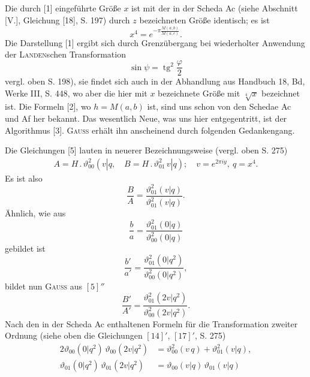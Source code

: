 \begingroup
\makeatletter\tagsleft@true\let\veqno\@@leqno\makeatother
\fancyhead{}
\begin{center}\end{center}
\par\indent Die durch [1] eingeführte Größe $x$ ist mit der in der Scheda Ac (siehe Abschnitt [V.], Gleichung [18], S. 197) durch $z$ bezeichneten Größe identisch; es ist
\[x^4=e^{-\pi\frac{M(a,b)}{M(a,c)}}.\]
\noindent Die Darstellung [1] ergibt sich durch Grenzübergang bei wiederholter Anwendung der \textsc{Landen}schen Transformation
\[\sin\psi=\operatorname{tg}^2\frac\varphi2\]
\noindent vergl. oben S. 198), sie findet sich auch in der Abhandlung aus Handbuch 18, Bd, Werke III, S. 448, wo aber die hier mit $x$ bezeichnete Größe mit $\sqrt[4]x$ bezeichnet ist. Die Formeln [2], wo $h=M(a,b)$ ist, sind uns schon von den Schedae Ac und Af her bekannt. Das wesentlich Neue, was uns hier entgegentritt, ist der Algorithmus [3]. \textsc{Gauss} erhält ihn anscheinend durch folgenden Gedankengang.
\par\indent Die Gleichungen [5] lauten in neuerer Bezeichnungsweise (vergl. oben S. 275)
\begin{equation*}\tag*{$[5]'$}\begin{gathered}
A=H\,.\,\vartheta_{00}^2(v|q,\quad B=H\,.\,\vartheta_{01}^2\,v|q);\quad v=e^{2\pi iy},\ q=x^4.
\end{gathered}\end{equation*}
\noindent Es ist also
\begin{equation*}\tag*{$[5]''$}\frac BA=\frac{\vartheta_{01}^2(v|q)}{\vartheta_{01}^2(v|q)}.\end{equation*}
\noindent Ähnlich, wie aus
\[\frac ba=\frac{\vartheta_{01}^2(0|q)}{\vartheta_{00}^2(0|q)}\]
\noindent gebildet ist
\[\frac{b'}{a'}=\frac{\vartheta_{01}^2(0|q^2)}{\vartheta_{00}^2(0|q^2)},\]
\noindent bildet nun \textsc{Gauss} aus $[5]''$
\[\frac{B'}{A'}=\frac{\vartheta_{01}^2(2v|q^2)}{\vartheta_{00}^2(2v|q^2)}.\]
\noindent Nach den in der Scheda Ac enthaltenen Formeln für die Transformation zweiter Ordnung (siehe oben die Gleichungen $[14]'$, $[17]'$, S. 275)
\clearpage
{}
\[\begin{aligned}
2\vartheta_{00}(0|q^2)\,\vartheta_{00}(2v|q^2)&=\vartheta_{00}^2(v\,q)+\vartheta_{01}^2(v|q),\\
\vartheta_{01}(0|q^2)\,\vartheta_{01}(2v|q^2)&=\vartheta_{00}(v|q)\,\vartheta_{01}(v|q)
\end{aligned}\]
